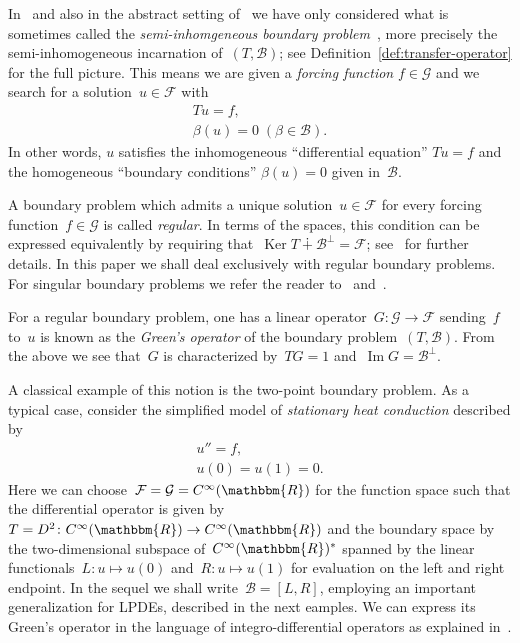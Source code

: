 \documentclass[a4paper]{llncs}
\let\mathbb\mathbbm
\newcommand{\RR}{\mathbb{R}}
\renewcommand{\ker}{\operatorname{Ker}}
\newcommand{\im}{\operatorname{Im}}
\newcommand{\orth}[1]{#1^\perp}
\newcommand{\galg}{\mathcal{F}}
\newcommand{\ogalg}{\mathcal{G}}
\newcommand{\bspc}{\mathcal{B}}
\newcommand{\bvp}[2]{\boxed{\begin{array}{l}#1\\#2\end{array}}}
\begin{document}
In~\cite{Rosenkranz2005,RosenkranzRegensburger2008a} and also in the abstract
setting of~\cite{RegensburgerRosenkranz2009} we have only considered what is
sometimes called the \emph{semi-inhomgeneous boundary
  problem}~\cite{Stakgold1979}, more precisely the semi-inhomogeneous
incarnation of~$(T, \mathcal{B})$; see Definition~\ref{def:transfer-operator}
for the full picture. This means we are given a \emph{forcing function} $f \in
\ogalg$ and we search for a solution~$u \in \galg$ with
\begin{equation}
  \bvp{Tu=f,}{\beta(u) = 0 \; (\beta \in \mathcal{B}).}
\end{equation}
In other words, $u$ satisfies the inhomogeneous ``differential equation'' $Tu =
f$ and the homogeneous ``boundary conditions'' $\beta(u) = 0$ given
in~$\mathcal{B}$.

A boundary problem which admits a unique solution~$u \in \galg$ for every
forcing function~$f \in \ogalg$ is called \emph{regular}. In terms of the
spaces, this condition can be expressed equivalently by requiring that~$\ker{T}
\dotplus \orth{\bspc} = \galg$; see~\cite{RegensburgerRosenkranz2009} for
further details. In this paper we shall deal exclusively with regular boundary
problems. For singular boundary problems we refer the reader
to~\cite{KorporalRegensburgerRosenkranz2011} and~\cite{Korporal2012}.

For a regular boundary problem, one has a linear operator~$G\colon \ogalg \to
\galg$ sending~$f$ to~$u$ is known as the \emph{Green's operator} of the
boundary problem~$(T, \mathcal{B})$. From the above we see that~$G$ is
characterized by~$TG=1$ and~$\im{G} = \orth{\mathcal{B}}$.

\begin{myexample}
  \label{ex:heat-conduction}
  A classical example of this notion is the two-point boundary problem. As a
  typical case, consider the simplified model of \emph{stationary heat
    conduction} described by
\begin{equation*}
    \bvp{u''=f,}{u(0) = u(1) = 0.}
  \end{equation*}
Here we can choose~$\galg = \ogalg = C^\infty(\RR)$ for the function space
  such that the differential operator is given by $T = D^2\colon C^\infty(\RR)
  \to C^\infty(\RR)$ and the boundary space by the two-dimensional subspace
  of~$C^\infty(\RR)^*$ spanned by the linear functionals~$L\colon u \mapsto
  u(0)$ and~$R\colon u \mapsto u(1)$ for evaluation on the left and right
  endpoint. In the sequel we shall write~$\mathcal{B} = [L, R]$, employing an
  important generalization for LPDEs, described in the next eamples. We can
  express its Green's operator in the language of integro-differential operators
  as explained in~\cite{RosenkranzRegensburger2008a}.
\end{myexample}
\end{document}
